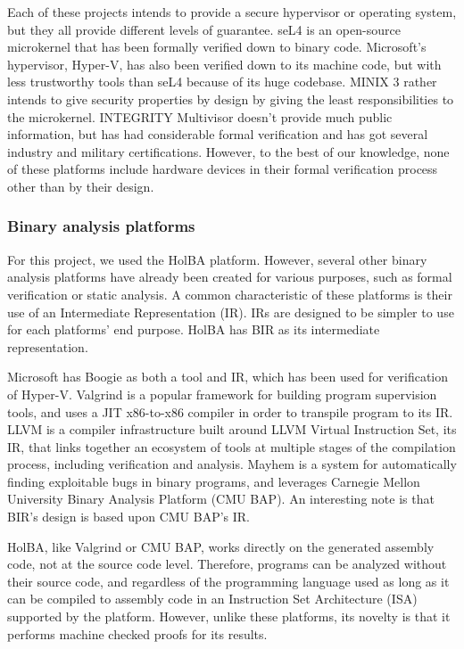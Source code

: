 \documentclass[10pt,a4paper]{article}
\begin{document}
\begin{multicols}{2}
Each of these projects intends to provide a secure hypervisor or operating system, but they all provide different levels of guarantee. seL4 is an open-source microkernel that has been formally verified down to binary code. Microsoft's hypervisor, Hyper-V, has also been verified down to its machine code, but with less trustworthy tools than seL4 because of its huge codebase. MINIX 3 rather intends to give security properties by design by giving the least responsibilities to the microkernel. INTEGRITY Multivisor doesn't provide much public information, but has had considerable formal verification and has got several industry and military certifications. However, to the best of our knowledge, none of these platforms include hardware devices in their formal verification process other than by their design.

\subsubsection{Binary analysis platforms}

For this project, we used the {HolBA} platform. However, several other binary analysis platforms have already been created for various purposes, such as formal verification or static analysis. A common characteristic of these platforms is their use of an Intermediate Representation ({IR}). IRs are designed to be simpler to use for each platforms' end purpose. HolBA has BIR as its intermediate representation.

Microsoft has Boogie as both a tool and IR, which has been used for verification of {Hyper\nobreakdash-\hspace{0pt}V}. Valgrind is a popular framework for building program supervision tools, and uses a JIT x86-to-x86 compiler in order to transpile program to its IR. LLVM is a compiler infrastructure built around LLVM Virtual Instruction Set, its {IR}, that links together an ecosystem of tools at multiple stages of the compilation process, including verification and analysis. Mayhem is a system for automatically finding exploitable bugs in binary programs, and leverages Carnegie Mellon University Binary Analysis Platform (CMU BAP). An interesting note is that BIR's design is based upon CMU BAP's IR.

HolBA, like Valgrind or CMU BAP, works directly on the generated assembly code, not at the source code level. Therefore, programs can be analyzed without their source code, and regardless of the programming language used as long as it can be compiled to assembly code in an Instruction Set Architecture ({ISA}) supported by the platform. However, unlike these platforms, its novelty is that it performs machine checked proofs for its results.


\end{multicols}
\end{document}

